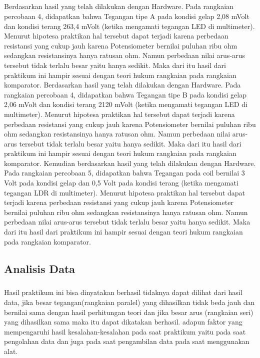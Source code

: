 \documentclass[12pt,a4paper]{article}
\begin{document}
\subparagraph{ }
	Berdasarkan hasil yang telah dilakukan dengan Hardware. Pada rangkaian percobaan 4, didapatkan bahwa Tegangan tipe A pada kondisi gelap 2,08 mVolt dan kondisi terang 263,4 mVolt (ketika mengamati tegangan LED di multimeter). Menurut hipotesa praktikan hal tersebut dapat terjadi karena perbedaan resistansi yang cukup jauh karena Potensiometer bernilai puluhan ribu ohm sedangkan resistansinya hanya ratusan ohm. Namun perbedaan nilai arus-arus tersebut tidak terlalu besar yaitu hanya sedikit. Maka dari itu hasil dari praktikum ini hampir sesuai dengan teori hukum rangkaian pada rangkaian komparator.
	Berdasarkan hasil yang telah dilakukan dengan Hardware. Pada rangkaian percobaan 4, didapatkan bahwa Tegangan tipe B pada kondisi gelap 2,06 mVolt dan kondisi terang 2120 mVolt (ketika mengamati tegangan LED di multimeter). Menurut hipotesa praktikan hal tersebut dapat terjadi karena perbedaan resistansi yang cukup jauh karena Potensiometer bernilai puluhan ribu ohm sedangkan resistansinya hanya ratusan ohm. Namun perbedaan nilai arus-arus tersebut tidak terlalu besar yaitu hanya sedikit. Maka dari itu hasil dari praktikum ini hampir sesuai dengan teori hukum rangkaian pada rangkaian komparator.
	Kemudian berdasarkan hasil yang telah dilakukan dengan Hardware. Pada rangkaian percobaan 5, didapatkan bahwa Tegangan pada coil bernilai 3 Volt pada kondisi gelap dan 0,5 Volt pada kondisi terang (ketika mengamati tegangan LDR di multimeter). Menurut hipotesa praktikan hal tersebut dapat terjadi karena perbedaan resistansi yang cukup jauh karena Potensiometer bernilai puluhan ribu ohm sedangkan resistansinya hanya ratusan ohm. Namun perbedaan nilai arus-arus tersebut tidak terlalu besar yaitu hanya sedikit. Maka dari itu hasil dari praktikum ini hampir sesuai dengan teori hukum rangkaian pada rangkaian komparator.
\newpage
 
\subsection{Analisis Data}
\subparagraph{}
	Hasil praktikum ini bisa dinyatakan berhasil tidaknya dapat dilihat dari hasil data, jika besar tegangan(rangkaian paralel) yang dihasilkan tidak beda jauh dan bernilai sama dengan hasil perhitungan teori dan jika besar arus (rangkaian seri) yang dihasilkan sama maka itu dapat dikatakan berhasil. adapun faktor yang mempengaruhi hasil kesalahan-kesalahan pada saat praktikum yaitu pada saat pengolahan data dan juga pada saat pengambilan data pada saat menggunakan alat.
 
\end{document}
